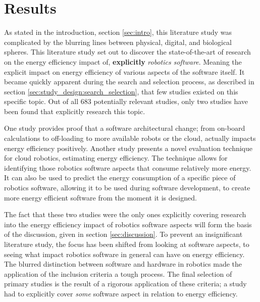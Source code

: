 \section{Results}
\label{sec:results}
As stated in the introduction, section \ref{sec:intro}, this literature study was complicated by 
the blurring lines between physical, digital, and biological spheres.
This literature study set out to discover the state-of-the-art of research on the energy efficiency impact of, \textbf{explicitly} \textit{robotics software}.
Meaning the explicit impact on energy efficiency of various aspects of the software itself.
It became quickly apparent during the search and selection process, as described in section \ref{sec:study_design:search_selection}, 
that few studies existed on this specific topic.
Out of all 683 potentially relevant studies, only two studies have been found that explicitly research this topic.

\vspace{2mm}

One study \cite{rahman2019cloud_robot_offloading} provides proof that a software architectural change; 
from on-board calculations to off-loading to more available robots or the cloud, actually impacts energy efficiency positively.
Another study \cite{hou2017novel_cloud_evaluation_model} presents a novel evaluation technique for cloud robotics, estimating energy efficiency.
The technique allows for identifying those robotics software aspects that consume relatively more energy. 
It can also be used to predict the energy consumption of a specific piece of robotics software, allowing it to be used during software development, 
to create more energy efficient software from the moment it is designed.

\vspace{2mm}

The fact that these two studies were the only ones explicitly covering research into the energy efficiency impact of robotics software aspects will
form the basis of the discussion, given in section \ref{sec:discussion}.
To prevent an insignificant literature study, the focus has been shifted from looking at software aspects, to seeing what impact 
robotics software in general can have on energy efficiency. The blurred distinction between software and hardware in robotics made the 
application of the inclusion criteria a tough process.
The final selection of primary studies is the result of a rigorous application of these criteria; 
a study had to explicitly cover \textit{some} software aspect in relation to energy efficiency.

